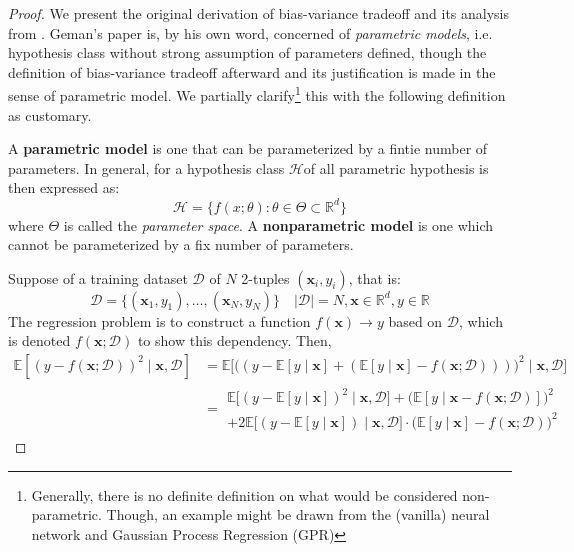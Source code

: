 \begin{proof}
    We present the original derivation of bias-variance tradeoff and its analysis from \cite{6797087}. Geman's paper is, by his own word, concerned of \textit{parametric models}, i.e. hypothesis class without strong assumption of parameters defined, though the definition of bias-variance tradeoff afterward and its justification is made in the sense of parametric model. We partially clarify\footnote{Generally, there is no definite definition on what would be considered non-parametric. Though, an example might be drawn from the (vanilla) neural network and Gaussian Process Regression (GPR)} this with the following definition as customary. 

    \begin{definition}[Parameterization]
        A \textbf{parametric model} is one that can be parameterized by a fintie number of parameters. In general, for a hypothesis class $\mathcal{H}$of all parametric hypothesis is then expressed as:
        \begin{equation}
            \mathcal{H} = \{f(x;\theta): \theta \in \Theta \subset \mathbb{R}^{d}\}
        \end{equation} where $\Theta$ is called the \textit{parameter space}. A \textbf{nonparametric model} is one which cannot be parameterized by a fix number of parameters.   
    \end{definition}
    Suppose of a training dataset $\mathcal{D}$ of $N$ 2-tuples $(\mathbf{x}_{i},y_{i})$, that is: \begin{equation}
        \mathcal{D} = \{(\mathbf{x}_{1},y_{1}),\dots,(\mathbf{x}_{N},y_{N})\} \quad \lvert \mathcal{D} \rvert = N, \mathbf{x}\in \mathbb{R}^{d}, y \in \mathbb{R}
    \end{equation}
    The regression problem is to construct a function $f(\mathbf{x})\to y$ based on $\mathcal{D}$, which is denoted $f(\mathbf{x};\mathcal{D})$ to show this dependency. Then, 
    \begin{equation}
        \begin{split}
            \mathbb{E}\left[ (y-f(\mathbf{x};\mathcal{D}))^{2}\mid \mathbf{x},\mathcal{D}\right] & = \mathbb{E}\Big[\big( (y-\mathbb{E}[y\mid \mathbf{x}]+ (\mathbb{E}[y\mid \mathbf{x}]-f(\mathbf{x};\mathcal{D}))) \big)^{2}\mid \mathbf{x},\mathcal{D}\Big]\\
            & = \begin{multlined}
                \mathbb{E} \Big[ (y- \mathbb{E}[y\mid \mathbf{x}])^{2}\mid \mathbf{x},\mathcal{D} \Big] + \Big(\mathbb{E}[y\mid \mathbf{x}-f(\mathbf{x};\mathcal{D})]\Big)^{2} \\ + 2\mathbb{E} \big[(y-\mathbb{E}[y\mid \mathbf{x}])\mid \mathbf{x},\mathcal{D}\big]\cdot \big(\mathbb{E}[y\mid \mathbf{x}]-f(\mathbf{x;\mathcal{D}})\big)^{2} 

\end{multlined}
\end{split}
\end{equation}
\end{proof}
